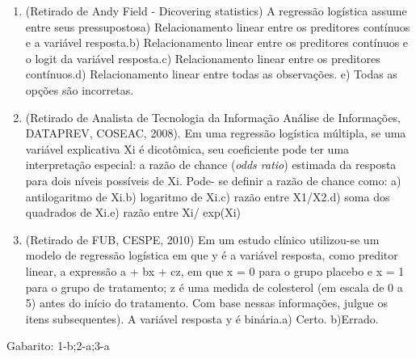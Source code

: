 \documentclass[
]{book}
\begin{document}
\begin{enumerate}
\def\labelenumi{\arabic{enumi}.}
\item
  (Retirado de Andy Field - Dicovering statistics) A regressão logística assume entre seus pressupostosa) Relacionamento linear entre os preditores contínuos e a variável resposta.b) Relacionamento linear entre os preditores contínuos e o logit da variável resposta.c) Relacionamento linear entre os preditores contínuos.d) Relacionamento linear entre todas as observações. e) Todas as opções são incorretas.
\item
  (Retirado de Analista de Tecnologia da Informação Análise de Informações, DATAPREV, COSEAC, 2008). Em uma regressão logística múltipla, se uma variável explicativa Xi é dicotômica, seu coeficiente pode ter uma interpretação especial: a razão de chance (\emph{odds ratio}) estimada da resposta para dois níveis possíveis de Xi. Pode- se definir a razão de chance como: a) antilogaritmo de Xi.b) logaritmo de Xi.c) razão entre X1/X2.d) soma dos quadrados de Xi.e) razão entre Xi/ exp(Xi)
\item
  (Retirado de FUB, CESPE, 2010) Em um estudo clínico utilizou-se um modelo de regressão logística em que y é a variável resposta, como preditor linear, a expressão a + bx + cz, em que x = 0 para o grupo placebo e x = 1 para o grupo de tratamento; z é uma medida de colesterol (em escala de 0 a 5) antes do início do tratamento. Com base nessas informações, julgue os itens subsequentes). A variável resposta y é binária.a) Certo.
  b)Errado.
\end{enumerate}

Gabarito: 1-b;2-a;3-a

  
\end{document}
